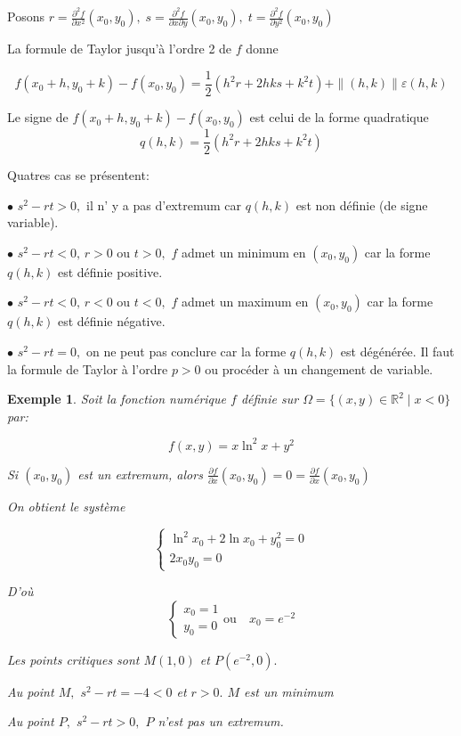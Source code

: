 \documentclass[11pt,a4paper]{report}
\newtheorem{ex}{Exemple}[section]
\begin{document}
Posons $r=\frac{\partial^2 f}{\partial x^2}(x_0,y_0),\; s=\frac{\partial^2 f}{\partial x \partial y}(x_0,y_0),\; t=\frac{\partial^2 f}{\partial y^2}(x_0,y_0)$

La formule de Taylor jusqu'à l'ordre 2 de $f$ donne

$$f(x_0+h,y_0+k)-f(x_0,y_0)=\frac{1}{2}(h^2 r+2 h k s+k^2 t)+\|(h,k)\|\varepsilon(h,k)$$

Le signe de $f(x_0+h,y_0+k)-f(x_0,y_0)$ est celui de la forme quadratique
$$q(h,k)=\frac{1}{2}(h^2 r+ 2hk s+k^2 t)$$

Quatres cas se présentent:

$\bullet$ $s^2-rt>0,$ il n' y a pas d'extremum car $q(h,k)$ est non définie (de signe variable).

$\bullet$ $s^2-rt<0,\,r>0$ ou $t>0,$ $f$ admet un minimum en $(x_0,y_0)$ car la forme $q(h,k)$ est définie positive.

$\bullet$ $s^2-rt<0,\,r<0$ ou $t<0,$ $f$ admet un maximum en $(x_0,y_0)$ car la forme $q(h,k)$ est définie négative.

$\bullet$ $s^2-rt=0,$ on ne peut pas conclure car la forme $q(h,k)$ est dégénérée. Il faut la formule de Taylor à l'ordre $p>0$ ou procéder à un changement de variable.

\begin{ex}
Soit la fonction numérique $f$ définie sur $\Omega=\{(x,y)\in \mathbb{R}^2\mid x<0\}$ par:

$$f(x,y)=x\ln^2 x+y^2$$

Si $(x_0,y_0)$ est un extremum, alors $\frac{\partial f}{\partial x}(x_0,y_0)=0=\frac{\partial f}{\partial x}(x_0,y_0)$

On obtient le système

\begin{equation*}
\begin{cases}
\ln^2 x_0+2\ln x_0+y_{0}^{2}=0\\
2 x_0 y_0=0
\end{cases}
\end{equation*}

D'où
\begin{equation*}
\begin{cases}
x_0=1\\
y_0=0
\end{cases}
\mbox{ou}\quad x_0=e^{-2}
\end{equation*}


Les points critiques sont $M(1,0)$ et $P(e^{-2},0).$

Au point $M,$ $s^2-rt=-4<0$ et $r>0.$ $M$ est un minimum

Au point $P,$ $s^2-rt>0,$ $P$ n'est pas un extremum.
\end{ex}
\end{document}
